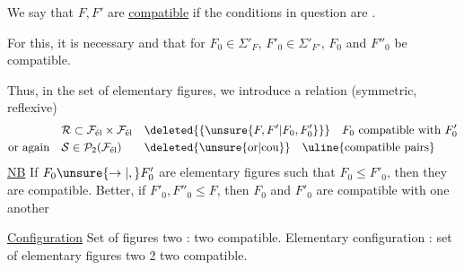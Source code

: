 We say that $F,F'$ are \uline{compatible} if the conditions in question are .

For this, it is necessary and  that for  $F_0\in\Sigma'_F$, $F'_0\in\Sigma'_{F'}$, $F_0$ and $F''_0$ be compatible.

Thus, in the  set of elementary figures, we introduce a relation (symmetric, reflexive)
\[
\begin{aligned}
&\mathcal{R}\subset\mathcal{F}_{\text{él}}\times\mathcal{F}_{\text{él}}&&\deleted{\{\unsure{F,F'|F_0,F'_0}\}}\quad \text{$F_0$ compatible with $F'_0$}\\
\text{or again}\quad&\mathcal{S}\in\mathcal{P}_2(\mathcal{F}_{\text{él}})&&\deleted{\text{\unsure{or|cou}}}\quad\text{\uline{compatible pairs}}
\end{aligned}
\]
\uline{NB} If  $F_0\unsure{\to|,} F'_0$ are elementary figures such that $F_0\le F'_0$, then they are compatible. Better, if $F'_0,F''_0\le F$, then $F_0$ and $F'_0$ are compatible with one another

\uline{Configuration} Set of figures two : two compatible. Elementary configuration : set of elementary figures two 2 two compatible.
